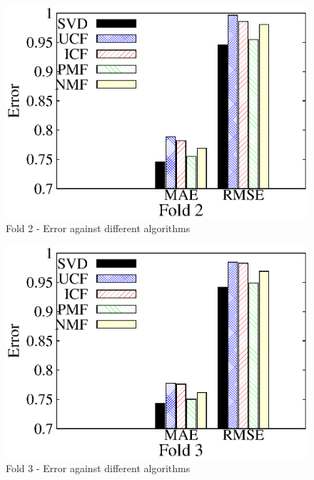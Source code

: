 \documentclass[journal,onecolumn]{IEEEtran}
\begin{document}
\begin{figure}[H]
\begin{center}
 \includegraphics[scale = 0.98] {images/fold2.eps}
 \caption {Fold 2 - Error against different algorithms} \label{fold2}
 \end{center}
\end{figure}

\begin{figure}[H]
\begin{center}
 \includegraphics[scale = 0.98] {images/fold3.eps}
 \caption {Fold 3 - Error against different algorithms} \label{fold3}
 \end{center}
\end{figure}
\end{document}
